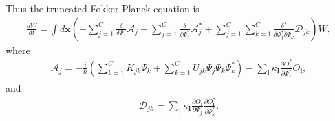 \documentclass[12pt,aip,jmp,amssymb,amsmath]{revtex4-1}
\begin{document}
Thus the truncated Fokker-Planck equation is
\begin{equation}\begin{split}
    \frac{dW}{dt}
    = \int d\boldsymbol{x} \left(
        - \sum_{j=1}^C \frac{\delta}{\delta \Psi_j} \mathcal{A}_j
        - \sum_{j=1}^C \frac{\delta}{\delta \Psi_j^*} \mathcal{A}_j^*
        + \sum_{j=1}^C \sum_{k=1}^C \frac{\delta^2}{\delta \Psi_j^* \delta \Psi_k} \mathcal{D}_{jk}
    \right) W,
\end{split}\end{equation}
where
\begin{equation}\begin{split}
    \mathcal{A}_j = -\frac{i}{\hbar} \left(
            \sum_{k=1}^C K_{jk} \Psi_k
            + \sum_{k=1}^C U_{jk} \Psi_j \Psi_k \Psi_k^*
        \right)
        - \sum_{\boldsymbol{l}} \kappa_{\boldsymbol{l}} \frac{\partial O_{\boldsymbol{l}}^*}{\partial \Psi_j^*} O_{\boldsymbol{l}},
\end{split}\end{equation}
and
\begin{equation}\begin{split}
    \mathcal{D}_{jk} = \sum_{\boldsymbol{l}} \kappa_{\boldsymbol{l}}
        \frac{\partial O_{\boldsymbol{l}}}{\partial \Psi_j}
        \frac{\partial O_{\boldsymbol{l}}^*}{\partial \Psi_k^*}.
\end{split}\end{equation}
\end{document}
